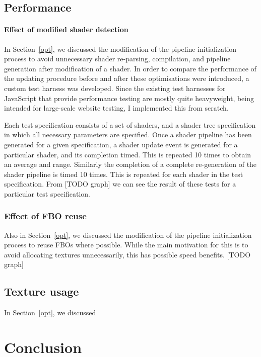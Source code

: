 \documentclass[12pt,twoside,notitlepage]{report}
\begin{document}
\section{Performance}
\subsubsection{Effect of modified shader detection}
In Section~\ref{opt}, we discussed the modification of the pipeline initialization process to avoid unnecessary shader re-parsing, compilation, and pipeline generation after modification of a shader. In order to compare the performance of the updating procedure before and after these optimisations were introduced, a custom test harness was developed. Since the existing test harnesses for JavaScript that provide performance testing are mostly quite heavyweight, being intended for large-scale website testing, I implemented this from scratch.

Each test specification consists of a set of shaders, and a shader tree specification in which all necessary parameters are specified. Once a shader pipeline has been generated for a given specification, a shader update event is generated for a particular shader, and its completion timed. This is repeated 10 times to obtain an average and range. Similarly the completion of a complete re-generation of the shader pipeline is timed 10 times. This is repeated for each shader in the test specification. From [TODO graph] we can see the result of these tests for a particular test specification.

\subsection{Effect of FBO reuse}
Also in Section~\ref{opt}, we discussed the modification of the pipeline initialization process to reuse FBOs where possible. While the main motivation for this is to avoid allocating textures unnecessarily, this has possible speed benefits. [TODO graph]

\section{Texture usage}
In Section~\ref{opt}, we discussed 

\cleardoublepage
\chapter{Conclusion}
\end{document}
